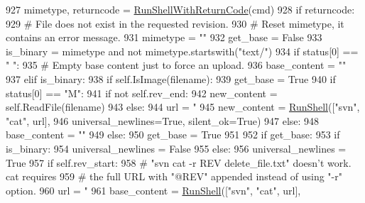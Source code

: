 \begin{DoxyCode}
{927       mimetype, returncode = \hyperlink{namespaceupload_afa542d3a5a4f4fce174a1c23644a9204}{RunShellWithReturnCode}(cmd)
928       \textcolor{keywordflow}{if} returncode:
929         \textcolor{comment}{# File does not exist in the requested revision.}
930         \textcolor{comment}{# Reset mimetype, it contains an error message.}
931         mimetype = \textcolor{stringliteral}{""}
932       get\_base = \textcolor{keyword}{False}
933       is\_binary = mimetype \textcolor{keywordflow}{and} \textcolor{keywordflow}{not} mimetype.startswith(\textcolor{stringliteral}{"text/"})
934       \textcolor{keywordflow}{if} status[0] == \textcolor{stringliteral}{" "}:
935         \textcolor{comment}{# Empty base content just to force an upload.}
936         base\_content = \textcolor{stringliteral}{""}
937       \textcolor{keywordflow}{elif} is\_binary:
938         \textcolor{keywordflow}{if} self.IsImage(filename):
939           get\_base = \textcolor{keyword}{True}
940           \textcolor{keywordflow}{if} status[0] == \textcolor{stringliteral}{"M"}:
941             \textcolor{keywordflow}{if} \textcolor{keywordflow}{not} self.rev\_end:
942               new\_content = self.ReadFile(filename)
943             \textcolor{keywordflow}{else}:
944               url = \textcolor{stringliteral}{"%
945               new\_content = \hyperlink{namespaceupload_adddc423c49132e8879cbb25d6be2cf11}{RunShell}([\textcolor{stringliteral}{"svn"}, \textcolor{stringliteral}{"cat"}, url],
946                                      universal\_newlines=\textcolor{keyword}{True}, silent\_ok=\textcolor{keyword}{True})
947         \textcolor{keywordflow}{else}:
948           base\_content = \textcolor{stringliteral}{""}
949       \textcolor{keywordflow}{else}:
950         get\_base = \textcolor{keyword}{True}
951 
952       \textcolor{keywordflow}{if} get\_base:
953         \textcolor{keywordflow}{if} is\_binary:
954           universal\_newlines = \textcolor{keyword}{False}
955         \textcolor{keywordflow}{else}:
956           universal\_newlines = \textcolor{keyword}{True}
957         \textcolor{keywordflow}{if} self.rev\_start:
958           \textcolor{comment}{# "svn cat -r REV delete\_file.txt" doesn't work. cat requires}
959           \textcolor{comment}{# the full URL with "@REV" appended instead of using "-r" option.}
960           url = \textcolor{stringliteral}{"%
961           base\_content = \hyperlink{namespaceupload_adddc423c49132e8879cbb25d6be2cf11}{RunShell}([\textcolor{stringliteral}{"svn"}, \textcolor{stringliteral}{"cat"}, url],
}}}
\end{DoxyCode}

